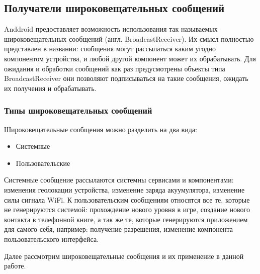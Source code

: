 \subsection*{Получатели широковещательных сообщений}
Anddroid предоставляет возможность использования так называемых широковещательных сообщений (англ. BroadcastReceiver).
Их смысл полностью представлен в названии: сообщения могут рассылаться каким угодно компонентом устройства, и любой другой компонент может их обрабатывать. Для ожидания и обработки сообщений как раз предусмотрены объекты типа BroadcastReceiver \textemdash\space они позволяют подписываться на такие сообщения, ожидать их получения и обрабатывать.

\subsubsection*{Типы широковещательных сообщений}
Широковещательные сообщения можно разделить на два вида:
\begin{itemize}
	\item Системные
	\item Пользовательские
\end{itemize}
\smallskip
Системные сообщение рассылаются системны сервисами и компонентами: изменения геолокации устройства, изменение заряда акуумулятора, изменение силы сигнала WiFi.
К пользовательским сообщениям относятся все те, которые не генерируются системой: прохождение нового уровня в игре, создание нового контакта в телефонной книге, а так же те, которые генерируются приложением для самого себя, например: получение разрешения, изменение компонента пользовательского интерфейса.

Далее рассмотрим широковещательные сообщения и их применение в данной работе.

